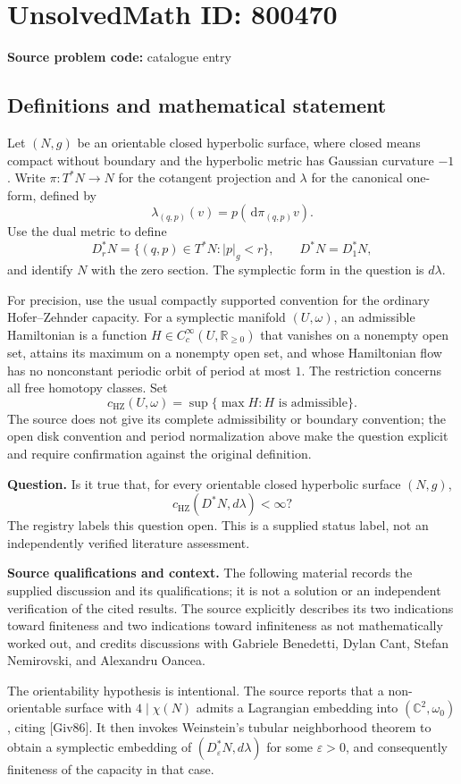 \documentclass[11pt]{article}
\newcommand{\R}{\mathbb{R}}
\newcommand{\C}{\mathbb{C}}
\newcommand{\dd}{\,\mathrm{d}}
\begin{document}
\section*{UnsolvedMath ID: 800470}
\textbf{Source problem code:} catalogue entry
\subsection{Definitions and mathematical statement}
Let \((N,g)\) be an orientable closed hyperbolic surface, where closed means compact without boundary and the hyperbolic metric has Gaussian curvature \(-1\). Write \(\pi:T^*N\to N\) for the cotangent projection and \(\lambda\) for the canonical one-form, defined by
\[
\lambda_{(q,p)}(v)=p(\dd\pi_{(q,p)}v).
\]
Use the dual metric to define
\[
D_r^*N=\{(q,p)\in T^*N:|p|_g<r\},\qquad D^*N=D_1^*N,
\]
and identify \(N\) with the zero section. The symplectic form in the question is \(d\lambda\).

For precision, use the usual compactly supported convention for the ordinary Hofer--Zehnder capacity. For a symplectic manifold \((U,\omega)\), an admissible Hamiltonian is a function \(H\in C_c^\infty(U,\R_{\geq0})\) that vanishes on a nonempty open set, attains its maximum on a nonempty open set, and whose Hamiltonian flow has no nonconstant periodic orbit of period at most \(1\). The restriction concerns all free homotopy classes. Set
\[
c_{\mathrm{HZ}}(U,\omega)=\sup\{\max H:H\text{ is admissible}\}.
\]
The source does not give its complete admissibility or boundary convention; the open disk convention and period normalization above make the question explicit and require confirmation against the original definition.

\textbf{Question.} Is it true that, for every orientable closed hyperbolic surface \((N,g)\),
\[
c_{\mathrm{HZ}}(D^*N,d\lambda)<\infty?
\]
The registry labels this question open. This is a supplied status label, not an independently verified literature assessment.

\textbf{Source qualifications and context.} The following material records the supplied discussion and its qualifications; it is not a solution or an independent verification of the cited results. The source explicitly describes its two indications toward finiteness and two indications toward infiniteness as not mathematically worked out, and credits discussions with Gabriele Benedetti, Dylan Cant, Stefan Nemirovski, and Alexandru Oancea.

The orientability hypothesis is intentional. The source reports that a non-orientable surface with \(4\mid\chi(N)\) admits a Lagrangian embedding into \((\C^2,\omega_0)\), citing [Giv86]. It then invokes Weinstein's tubular neighborhood theorem to obtain a symplectic embedding of \((D_\varepsilon^*N,d\lambda)\) for some \(\varepsilon>0\), and consequently finiteness of the capacity in that case.
\end{document}
